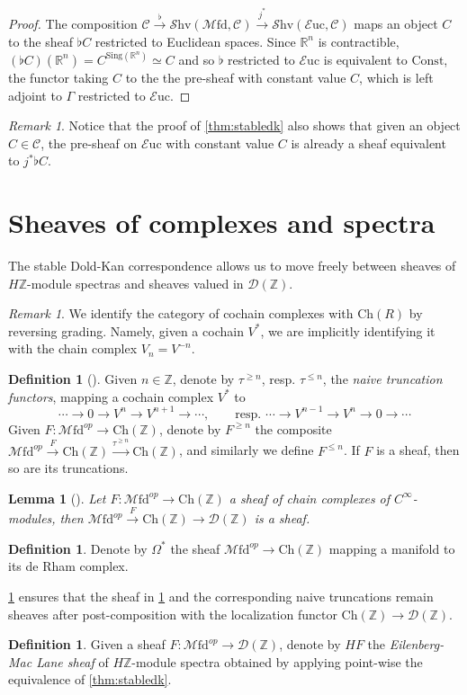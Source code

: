 \documentclass[10pt]{amsart}
\newcommand{\C}{\mathscr{C}}
\newcommand{\D}{\mathscr{D}}
\newcommand{\bR}{\mathbb{R}}
\newcommand{\bZ}{\mathbb{Z}}
\newcommand{\Ch}{\mathrm{Ch}}
\newcommand{\Euc}{\mathscr{E}\mathrm{uc}}
\newcommand{\Mfd}{\mathscr{M}\mathrm{fd}}
\newcommand{\Shv}{\mathscr{S}\mathrm{hv}}
\newcommand{\Sing}{\mathrm{Sing}}
\newtheorem{lemma}[equation]{Lemma}
\theoremstyle{definition}
\newtheorem{definition}[equation]{Definition}
\theoremstyle{remark}
\newtheorem{remark}[equation]{Remark}
\numberwithin{equation}{section}
\begin{document}
\begin{proof}
  The composition $\C\xrightarrow{\flat}\Shv(\Mfd,\C)\xrightarrow{j^*}\Shv(\Euc,\C)$ maps an object $C$ to the sheaf $\flat C$ restricted to Euclidean spaces. Since $\bR^n$ is contractible, $(\flat C)(\bR^n)=C^{\Sing(\bR^n)}\simeq C$ and so $\flat$ restricted to $\Euc$ is equivalent to $\mathrm{Const}$, the functor taking $C$ to the the pre-sheaf with constant value $C$, which is left adjoint to $\Gamma$ restricted to $\Euc$.
\end{proof}
\begin{remark}\label{rmk:constsheaf}
  Notice that the proof of \cref{thm:stabledk} also shows that given an object $C\in\C$, the pre-sheaf on $\Euc$ with constant value $C$ is already a sheaf equivalent to $j^*\flat C$.
\end{remark}

\section{Sheaves of complexes and spectra}
The stable Dold-Kan correspondence allows us to move freely between sheaves of $H\bZ$-module spectras and sheaves valued in $\D(\bZ)$.

\begin{remark}\label{rmk:identification}
  We identify the category of cochain complexes with $\Ch(R)$ by reversing grading. Namely, given a cochain $V^*$, we are implicitly identifying it with the chain complex $V_n=V^{-n}$. 
\end{remark}
\begin{definition}[{\cite[Definition 7.14]{bunkenikolausvoelkl2016diffcoh}}]Given $n\in\bZ$, denote by $\tau^{\geq n}$, resp. $\tau^{\leq n}$, the \emph{naive truncation functors}, mapping a cochain complex $V^*$ to \[\cdots\to0\to V^n\to V^{n+1}\to\cdots, \qquad \mbox{resp. }\cdots\to V^{n-1}\to V^n\to0\to\cdots\]Given $F:\Mfd^{op}\to\Ch(\bZ)$, denote by $F^{\geq n}$ the composite $\Mfd^{op}\xrightarrow{F}\Ch(\bZ)\xrightarrow{\tau^{\geq n}}\Ch(\bZ)$, and similarly we define $F^{\leq n}$. If $F$ is a sheaf, then so are its truncations. 
\end{definition}
\begin{lemma}[{\cite[Lemma 7.12]{bunkenikolausvoelkl2016diffcoh}}]\label{lem:sheafloc}
  Let $F:\Mfd^{op}\to\Ch(\bZ)$ a sheaf of chain complexes of $C^\infty$-modules, then $\Mfd^{op}\xrightarrow{F}\Ch(\bZ)\to\D(\bZ)$ is a sheaf. 
\end{lemma}
\begin{definition}\label{def:forms}
  Denote by $\Omega^*$ the sheaf $\Mfd^{op}\to\Ch(\bZ)$ mapping a manifold to its de Rham complex. 
\end{definition}
\cref{lem:sheafloc} ensures that the sheaf in \cref{def:forms} and the corresponding naive truncations remain sheaves after post-composition with the localization functor $\Ch(\bZ)\to\D(\bZ)$.  
\begin{definition}\label{def:EMsheaf}
  Given a sheaf $F:\Mfd^{op}\to\D(\bZ)$, denote by $HF$ the \emph{Eilenberg-Mac Lane sheaf} of $H\bZ$-module spectra obtained by applying point-wise the equivalence of \cref{thm:stabledk}. 
\end{definition}
\end{document}
